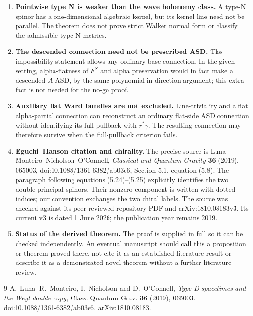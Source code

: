 \documentclass[11pt]{article}
\theoremstyle{definition}
\theoremstyle{remark}
\begin{document}
\begin{enumerate}[leftmargin=*,label=\arabic*.]
\item \textbf{Pointwise type N is weaker than the wave holonomy class.}
A type-N spinor has a one-dimensional algebraic kernel, but its kernel
line need not be parallel. The theorem does not prove strict Walker
normal form or classify the admissible type-N metrics.

\item \textbf{The descended connection need not be prescribed ASD.}
The impossibility statement allows any ordinary base connection. In the
given setting, alpha-flatness of $F^S$ and alpha preservation would in
fact make a descended $A$ ASD, by the same polynomial-in-direction
argument; this extra fact is not needed for the no-go proof.

\item \textbf{Auxiliary flat Ward bundles are not excluded.}
Line-triviality and a flat alpha-partial connection can reconstruct an
ordinary flat-side ASD connection without identifying its full pullback
with $r^*\gamma$. The resulting connection may therefore survive when
the full-pullback criterion fails.

\item \textbf{Eguchi--Hanson citation and chirality.}
The precise source is Luna--Monteiro--Nicholson--O'Connell,
\emph{Classical and Quantum Gravity} \textbf{36} (2019), 065003,
doi:10.1088/1361-6382/ab03e6, Section 5.1, equation (5.8).
The paragraph following equations (5.24)--(5.25) explicitly identifies
the two double principal spinors. Their nonzero component is written
with dotted indices; our convention exchanges the two chiral labels.
The source was checked against its peer-reviewed repository PDF and
arXiv:1810.08183v3. Its current v3 is dated 1 June 2026; the publication
year remains 2019.

\item \textbf{Status of the derived theorem.}
The proof is supplied in full so it can be checked independently. An
eventual manuscript should call this a proposition or theorem proved
there, not cite it as an established literature result or describe it as
a demonstrated novel theorem without a further literature review.
\end{enumerate}

\begin{thebibliography}{9}
A.~Luna, R.~Monteiro, I.~Nicholson and D.~O'Connell,
\emph{Type D spacetimes and the Weyl double copy},
Class. Quantum Grav. \textbf{36} (2019), 065003.
\href{https://doi.org/10.1088/1361-6382/ab03e6}{doi:10.1088/1361-6382/ab03e6}.
\href{https://arxiv.org/abs/1810.08183}{arXiv:1810.08183}.
\end{thebibliography}
\end{document}
